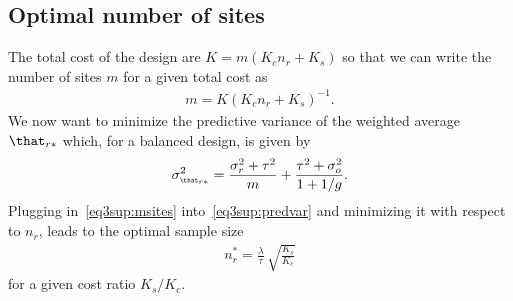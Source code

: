 \begin{subappendices}
\subsection{Optimal number of sites}
\label{sec3sup:multi}
The total cost of the design are $K = m(K_{c}n_{r} + K_{s})$ so that we can
write the number of sites $m$ for a given total cost as
\begin{align}
  \label{eq3sup:msites}
  m = K (K_{c}n_{r} + K_{s})^{-1}.
\end{align}
We now want to minimize the predictive variance of the weighted average
$\that_{r*}$ which, for a balanced design, is given by
\begin{align}
  \label{eq3sup:predvar}
  \sigma^{2}_{\scriptscriptstyle \that_{r*}}
  = \frac{\sigma^{2}_{r} + \tau^{2}}{m} + \frac{\tau^{2} + \sigma^{2}_{o}}{1 + 1/g}.
\end{align}
Plugging in~\eqref{eq3sup:msites} into~\eqref{eq3sup:predvar} and minimizing it with
respect to $n_{r}$, leads to the optimal sample size
\begin{align*}
  n_{r}^{*}
  = \frac{\lambda}{\tau} \, \sqrt{\frac{K_{s}}{K_{c}}}
\end{align*}
for a given cost ratio $K_{s}/K_{c}$.

\begin{figure}[!htb]


\end{figure}
\end{subappendices}
